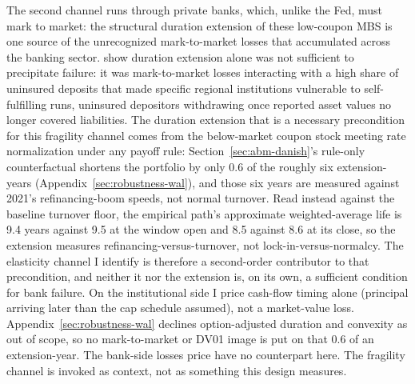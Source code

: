 \documentclass[12pt]{article}
\begin{document}
The second channel runs through private banks, which, unlike the Fed, must mark to market: the structural duration extension of these low-coupon MBS is one source of the unrecognized mark-to-market losses that accumulated across the banking sector. \citet{jiang2023} show duration extension alone was not sufficient to precipitate failure: it was mark-to-market losses interacting with a high share of uninsured deposits that made specific regional institutions vulnerable to self-fulfilling runs, uninsured depositors withdrawing once reported asset values no longer covered liabilities. The duration extension that is a necessary precondition for this fragility channel comes from the below-market coupon stock meeting rate normalization under any payoff rule: Section~\ref{sec:abm-danish}'s rule-only counterfactual shortens the portfolio by only 0.6 of the roughly six extension-years (Appendix~\ref{sec:robustness-wal}), and those six years are measured against 2021's refinancing-boom speeds, not normal turnover. Read instead against the baseline turnover floor, the empirical path's approximate weighted-average life is 9.4 years against 9.5 at the window open and 8.5 against 8.6 at its close, so the extension measures refinancing-versus-turnover, not lock-in-versus-normalcy. The elasticity channel I identify is therefore a second-order contributor to that precondition, and neither it nor the extension is, on its own, a sufficient condition for bank failure. On the institutional side I price cash-flow timing alone (principal arriving later than the cap schedule assumed), not a market-value loss. Appendix~\ref{sec:robustness-wal} declines option-adjusted duration and convexity as out of scope, so no mark-to-market or DV01 image is put on that 0.6 of an extension-year. The bank-side losses \citet{jiang2023} price have no counterpart here. The fragility channel is invoked as context, not as something this design measures.
\end{document}
